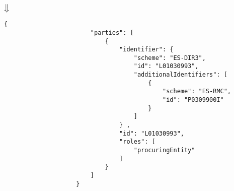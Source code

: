                 \begin{center}
                    $\big\Downarrow$
                \end{center}
                
                \begin{lstlisting}[language=lJSON]
                    {
                        "parties": [
                            {
                                "identifier": {
                                    "scheme": "ES-DIR3",
                                    "id": "L01030993",
                                    "additionalIdentifiers": [
                                        {
                                            "scheme": "ES-RMC",
                                            "id": "P0309900I"
                                        }
                                    ]
                                } ,
                                "id": "L01030993",
                                "roles": [
                                    "procuringEntity"
                                ]
                            }
                        ]
                    }
                \end{lstlisting}
\newpage
